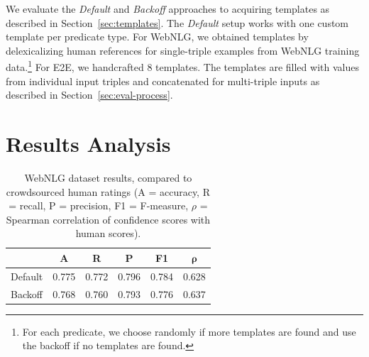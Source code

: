 We evaluate the \emph{Default} and \emph{Backoff} approaches to acquiring templates as described in Section~\ref{sec:templates}. The \emph{Default} setup works with one custom template per predicate type. For WebNLG, we obtained templates by delexicalizing human references for single-triple examples from WebNLG training data.\footnote{For each predicate, we choose randomly if more templates are found and use the backoff if no templates are found.} For E2E, we handcrafted 8 templates.
The templates are filled with values from individual input triples and concatenated for multi-triple inputs as described in Section~\ref{sec:eval-process}. %



\section{Results Analysis}
\label{sec:results}


\begin{table}[t]
    \centering \small
    \begin{tabular}{l ccccc} \toprule
                & \textbf{A} & \textbf{R} & \textbf{P} & \textbf{F1} & $\mathbf{\rho}$ \\\midrule
        Default & 0.775      & 0.772      & 0.796      & 0.784       & 0.628           \\
        Backoff & 0.768      & 0.760      & 0.793      & 0.776       & 0.637           \\ \bottomrule
    \end{tabular}
    \caption{WebNLG dataset results, compared to crowdsourced human ratings (A = accuracy, R = recall, P = precision, F1 = F-measure, $\rho$ = Spearman correlation of confidence scores with human scores).}
    \label{tab:webnlg}
\end{table}

